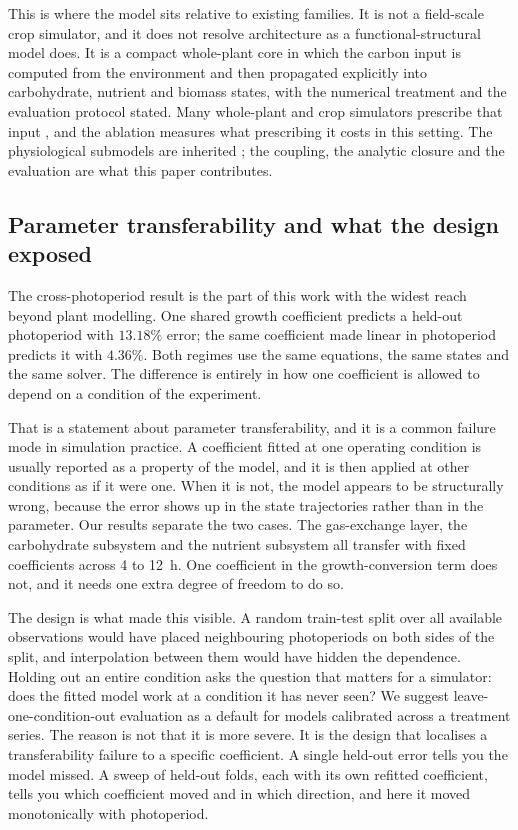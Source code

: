 This is where the model sits relative to existing families. It is not a
field-scale crop simulator, and it does not resolve architecture as a
functional-structural model does. It is a compact whole-plant core in which the
carbon input is computed from the environment and then propagated explicitly
into carbohydrate, nutrient and biomass states, with the numerical treatment and
the evaluation protocol stated. Many whole-plant and crop simulators prescribe
that input \citep{Holzworth2014,Jones2003,deWit2019}, and the ablation measures
what prescribing it costs in this setting. The physiological submodels are
inherited \citep{Farquhar1980,Jarvis1976,vonCaemmerer2000}; the coupling, the
analytic closure and the evaluation are what this paper contributes.

\subsection{Parameter transferability and what the design exposed}

The cross-photoperiod result is the part of this work with the widest reach
beyond plant modelling. One shared growth coefficient predicts a held-out
photoperiod with $13.18\%$ error; the same coefficient made linear in
photoperiod predicts it with $4.36\%$. Both regimes use the same equations, the
same states and the same solver. The difference is entirely in how one
coefficient is allowed to depend on a condition of the experiment.

That is a statement about parameter transferability, and it is a common failure
mode in simulation practice. A coefficient fitted at one operating condition is
usually reported as a property of the model, and it is then applied at other
conditions as if it were one. When it is not, the model appears to be
structurally wrong, because the error shows up in the state trajectories rather
than in the parameter. Our results separate the two cases. The gas-exchange
layer, the carbohydrate subsystem and the nutrient subsystem all transfer with
fixed coefficients across 4 to 12~h. One coefficient in the growth-conversion
term does not, and it needs one extra degree of freedom to do so.

The design is what made this visible. A random train-test split over all
available observations would have placed neighbouring photoperiods on both
sides of the split, and interpolation between them would have hidden the
dependence. Holding out an entire condition asks the question that matters for
a simulator: does the fitted model work at a condition it has never seen? We
suggest leave-one-condition-out evaluation as a default for models calibrated
across a treatment series. The reason is not that it is more severe. It is the
design that localises a transferability failure to a specific coefficient. A
single held-out error tells you the model missed. A
sweep of held-out folds, each with its own refitted coefficient, tells you
which coefficient moved and in which direction, and here it moved monotonically
with photoperiod.

